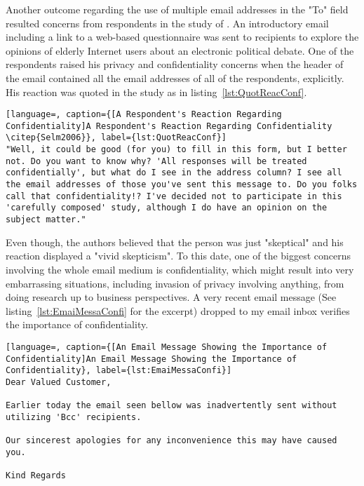 Another outcome regarding the use of multiple email addresses in the "To" field resulted concerns from respondents in the study of \cite{Selm2006}. An introductory email including a link to a web-based questionnaire was sent to recipients to explore the opinions of elderly Internet users about an electronic political debate. One of the respondents raised his privacy and confidentiality concerns when the header of the email contained all the email addresses of all of the respondents, explicitly. His reaction was quoted in the study as in listing~\ref{lst:QuotReacConf}.
\vspace{1cm}

\clearpage


\begin{lstlisting}[language=, caption={[A Respondent's Reaction Regarding Confidentiality]A Respondent's Reaction Regarding Confidentiality \citep{Selm2006}}, label={lst:QuotReacConf}]
"Well, it could be good (for you) to fill in this form, but I better not. Do you want to know why? 'All responses will be treated confidentially', but what do I see in the address column? I see all the email addresses of those you've sent this message to. Do you folks call that confidentiality!? I've decided not to participate in this 'carefully composed' study, although I do have an opinion on the subject matter."
\end{lstlisting}

Even though, the authors believed that the person was just "skeptical" and his reaction displayed a "vivid skepticism". To this date, one of the biggest concerns involving the whole email medium is confidentiality, which might result into very embarrassing situations, including invasion of privacy involving anything, from doing research up to business perspectives. A very recent email message (See listing~\ref{lst:EmaiMessaConfi} for the excerpt) dropped to my email inbox verifies the importance of confidentiality.  
\vspace{1cm}

\begin{lstlisting}[language=, caption={[An Email Message Showing the Importance of Confidentiality]An Email Message Showing the Importance of Confidentiality}, label={lst:EmaiMessaConfi}]
Dear Valued Customer,

Earlier today the email seen bellow was inadvertently sent without utilizing 'Bcc' recipients.

Our sincerest apologies for any inconvenience this may have caused you.

Kind Regards
\end{lstlisting}

